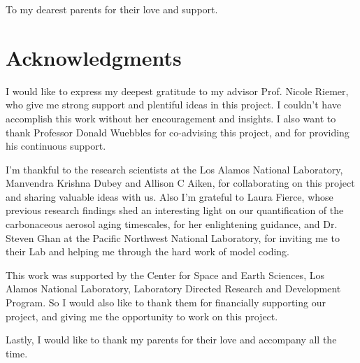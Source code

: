 \documentclass[12pt, fullpage]{uiucthesis2009}
\begin{document}
\begin{dedication}
To my dearest parents for their love and support.
\end{dedication}

\chapter*{Acknowledgments}

I would like to express my deepest gratitude to my advisor Prof. Nicole Riemer, who give me strong support and plentiful ideas in this project. I couldn't have accomplish this work without her encouragement and insights. I also want to thank Professor Donald Wuebbles for co-advising this project, and for providing his continuous support.

I'm thankful to the research scientists at the Los Alamos National Laboratory, Manvendra Krishna Dubey and Allison C Aiken, for collaborating on this project and sharing valuable ideas with us. Also I'm grateful to Laura Fierce, whose previous research findings shed an interesting light on our quantification of the carbonaceous aerosol aging timescales, for her enlightening guidance, and Dr. Steven Ghan at the Pacific Northwest National Laboratory, for inviting me to their Lab and helping me through the hard work of model coding.

This work was supported by the Center for Space and Earth Sciences, Los Alamos National Laboratory, Laboratory Directed Research and Development Program. So I would also like to thank them for financially supporting our project, and giving me the opportunity to work on this project.

Lastly, I would like to thank my parents for their love and accompany all the time.

\end{document}
